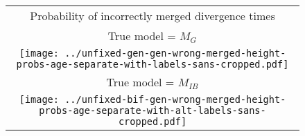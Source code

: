 \documentclass[border=10pt,varwidth=30cm]{standalone}
\newcommand{\genmodel}{\ensuremath{M_{G}}\xspace}
\newcommand{\bimodel}{\ensuremath{M_{IB}}\xspace}
\begin{document}
\begin{figure}
    \setlength\arrayrulewidth{2pt}
    \centering
    \begin{tabular}{@{}c@{}}
        {\large Probability of incorrectly merged divergence times} \\[0.5ex]
        {\large True model = \genmodel} \\[0.5ex]
        \texttt{[image: ../unfixed-gen-gen-wrong-merged-height-probs-age-separate-with-labels-sans-cropped.pdf]} \\
        {\large True model = \bimodel} \\[0.5ex]
        \texttt{[image: ../unfixed-bif-gen-wrong-merged-height-probs-age-separate-with-alt-labels-sans-cropped.pdf]} \\
    \end{tabular}
\end{figure}
\end{document}
